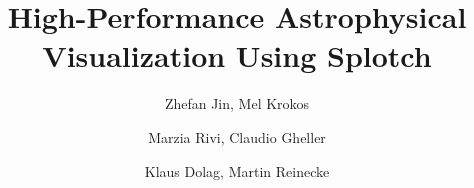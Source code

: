 \documentclass[1p,times]{elsarticle}
\begin{document}
\begin{frontmatter}



\dochead{}

\title{High-Performance Astrophysical Visualization Using Splotch}


\author{Zhefan Jin, Mel Krokos}
\address{School of Creative Technologies, University of Portsmouth, Winston Churchill Avenue, Portsmouth, United Kingdom}

\author{Marzia Rivi, Claudio Gheller}
\address{CINECA, Via Magnanelli 6/3, Casalecchio di Reno, Italy}

\author{Klaus Dolag, Martin Reinecke}
\address{Max-Planck-Institut f\"ur Astrophysik, Karl-Schwarzschild Strasse 1, Garching bei M\"unchen, Germany}

%
%

\begin{abstract}


\end{abstract}
\end{frontmatter}
\end{document}
